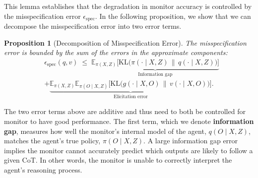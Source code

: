 \documentclass{article}
\theoremstyle{plain}
\newtheorem{proposition}[theorem]{Proposition}
\newtheorem{lemma}[theorem]{Lemma}
\begin{document}

This lemma establishes that the degradation in monitor accuracy is controlled by the misspecification error \(\epsilon_{\mathrm{spec}}\).
In the following proposition, we show that we can decompose the misspecification error into two error terms.

\begin{proposition}[Decomposition of Misspecification Error]
\label{prop:misspecification-error}
The misspecification error is bounded by the sum of the errors in the approximate components:
\begin{align*}
&\epsilon_{\mathrm{spec}}(q,v) \;\le\; 
\underbrace{\mathbb{E}_{\pi(X,Z)} \big[\mathrm{KL}\!\big(\pi(\cdot\mid X,Z)\,\big\|\,q(\cdot\mid X,Z)\big)\big]}_\text{Information gap} 
\\ &
+ \underbrace{\mathbb{E}_{\pi(X,Z)}\mathbb{E}_{\pi(O\mid X,Z)} \big[\mathrm{KL}\!\big(g(\cdot\mid X,O)\,\big\|\,v(\cdot\mid X,O)\big)\big]}_\text{Elicitation error}.
\end{align*}
\end{proposition}

The two error terms above are additive and thus need to both be controlled for monitor to have good performance.
The first term, which we denote \textbf{information gap}, measures how well the monitor's internal model of the agent, \(q(O\mid X,Z)\), matches the agent's true policy, \(\pi(O\mid X,Z)\). 
A large information gap error implies the monitor cannot accurately predict which outputs are likely to follow a given CoT.
In other words, the monitor is unable to correctly interpret the agent's reasoning process.
\end{document}
